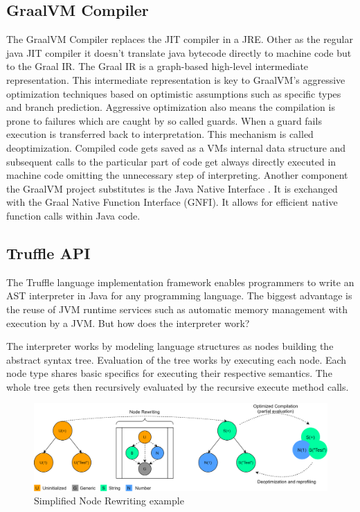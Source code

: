 \subsection{GraalVM Compiler}\label{sec:graalcomp}
The GraalVM Compiler replaces the JIT compiler in a JRE. Other as the regular java JIT compiler it doesn't translate java bytecode directly to machine code but to the Graal IR. \cite{inproceedings} The Graal IR is a graph-based high-level intermediate representation. This intermediate representation is key to GraalVM's aggressive optimization techniques based on optimistic assumptions such as specific types and branch prediction. Aggressive optimization also means the compilation is prone to failures which are caught by so called guards. When a guard fails execution is transferred back to interpretation. This mechanism is called deoptimization. \cite{ChambDeopt} Compiled code gets saved as a VMs internal data structure and subsequent calls to the particular part of code get always directly executed in machine code omitting the unnecessary step of interpreting. Another component the GraalVM project substitutes is the Java Native Interface \cite{Lindholm}. It is exchanged with the Graal Native Function Interface (GNFI). \cite{grimmerNative} It allows for efficient native function calls within Java code.
\subsection{Truffle API}
The Truffle language implementation framework enables programmers to write an AST interpreter in Java for any programming language. The biggest advantage is the reuse of JVM runtime services such as automatic memory management with execution by a JVM. But how does the interpreter work?

The interpreter works by modeling language structures as nodes building the abstract syntax tree. Evaluation of the tree works by executing each node. Each node type shares basic specifics for executing their respective semantics. The whole tree gets then recursively evaluated by the recursive execute method calls.

\begin{figure}[h!]
    \includegraphics[scale=0.165]{../figures/NodeJIT.png}
    \caption{Simplified Node Rewriting example}
    \label{fig:trufNR}
\end{figure}

